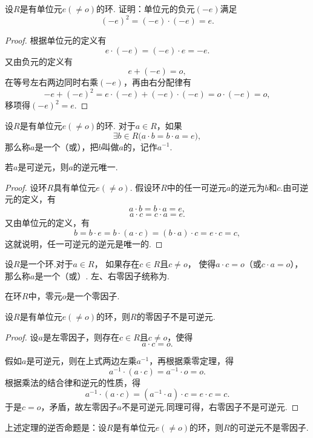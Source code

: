 \begin{example}
设\(R\)是有单位元\(e(\neq o)\)的环.
证明：单位元的负元\((-e)\)满足\[
(-e)^2=(-e)\cdot(-e)=e.
\]
\begin{proof}
根据单位元的定义有\[
e \cdot (-e) = (-e) \cdot e = -e.
\]又由负元的定义有\[
e + (-e) = o,
\]在等号左右两边同时右乘\((-e)\)，再由右分配律有\[
-e + (-e)^2 = e \cdot (-e) + (-e) \cdot (-e) = o \cdot (-e) = o,
\]移项得\((-e)^2 = e\).
\end{proof}
\end{example}

\begin{definition}
设\(R\)是有单位元\(e(\neq o)\)的环.
对于\(a \in R\)，如果\[
\exists b \in R \bigl( a \cdot b = b \cdot a = e \bigr),
\]那么称\(a\)是一个（或），把\(b\)叫做\(a\)的，记作\(a^{-1}\).
\end{definition}

\begin{property}
若\(a\)是可逆元，则\(a\)的逆元唯一.
\begin{proof}
设环\(R\)具有单位元\(e(\neq o)\).
假设环\(R\)中的任一可逆元\(a\)的逆元为\(b\)和\(c\).由可逆元的定义，有\[
a \cdot b = b \cdot a = e,
\]\[
a \cdot c = c \cdot a = e.
\]又由单位元的定义，有\[
b = b \cdot e
= b \cdot (a \cdot c)
= (b \cdot a) \cdot c
= e \cdot c
= c,
\]这就说明，任一可逆元的逆元是唯一的.
\end{proof}
\end{property}

\begin{definition}
设\(R\)是一个环.对于\(a \in R\)，%
如果存在\(c \in R\)且\(c \neq o\)，%
使得\(a \cdot c = o\)（或\(c \cdot a = o\)），%
那么称\(a\)是一个（或）.
左、右零因子统称为.
\end{definition}

\begin{property}
在环\(R\)中，零元\(o\)是一个零因子.
\end{property}

\begin{theorem}
设\(R\)是有单位元\(e(\neq o)\)的环，则\(R\)的零因子不是可逆元.
\begin{proof}
设\(a\)是左零因子，则存在\(c \in R\)且\(c \neq o\)，使得\[
a \cdot c = o.
\]

假如\(a\)是可逆元，则在上式两边左乘\(a^{-1}\)，再根据乘零定理，得\[
a^{-1} \cdot (a \cdot c) = a^{-1} \cdot o = o.
\]根据乘法的结合律和逆元的性质，得\[
a^{-1} \cdot (a \cdot c) = (a^{-1} \cdot a) \cdot c = e \cdot c = c.
\]于是\(c = o\)，矛盾，故左零因子\(a\)不是可逆元.同理可得，右零因子不是可逆元.
\end{proof}
\end{theorem}
上述定理的逆否命题是：设\(R\)是有单位元\(e(\neq o)\)的环，则\(R\)的可逆元不是零因子.

